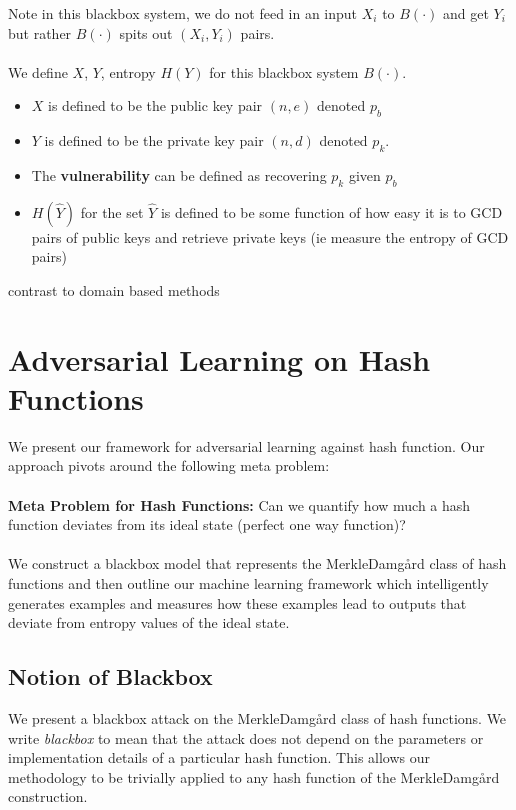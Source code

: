 \documentclass[letterpaper,twocolumn,10pt]{article}
\begin{document}
Note in this blackbox system, we do not feed in an input $X_{i}$ to $B(\cdot)$ and get $Y_{i}$ but rather $B(\cdot)$ spits out $(X_{i}, Y_{i})$ pairs. 
\\
\\
We define $X$, $Y$, entropy $H(Y)$ for this blackbox system $B(\cdot)$.
\begin{itemize}
\item $X$ is defined to be the public key pair $(n, e)$ denoted $p_{b}$
\item $Y$ is defined to be the private key pair $(n, d)$ denoted $p_{k}$.
\item The \textbf{vulnerability} can be defined as recovering $p_{k}$ given $p_{b}$
\item $H(\hat{Y})$ for the set $\hat{Y}$ is defined to be some function of how easy it is to GCD pairs of public keys and retrieve private keys (ie measure the entropy of GCD pairs)
\end{itemize}

contrast to domain based methods 
\section{Adversarial Learning on Hash Functions}
We present our framework for adversarial learning against hash function. Our approach pivots around the following meta problem:
\\
\\
\textbf{Meta Problem for Hash Functions:} Can we quantify how much a hash function deviates from its ideal state (perfect one way function)?
\\
\\
We construct a blackbox model that represents the Merkle{\textendash}Damg\r{a}rd class of hash functions and then outline our machine learning framework which intelligently generates examples and measures how these examples lead to outputs that deviate from entropy values of the ideal state.

\subsection{Notion of Blackbox} \label{sec:sufcond}
We present a blackbox attack on the Merkle{\textendash}Damg\r{a}rd class of hash functions. We write \emph{blackbox} to mean that the attack does not depend on the parameters or implementation details of a particular hash function. This allows our methodology to be trivially applied to any hash function of the Merkle{\textendash}Damg\r{a}rd construction. 
\end{document}
